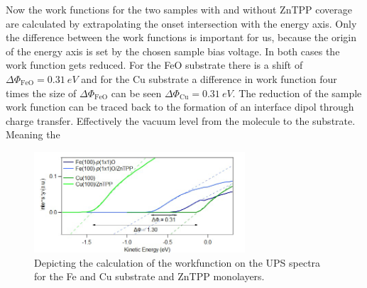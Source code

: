 Now the work functions for the two samples with and without ZnTPP coverage are calculated by extrapolating the onset intersection with the energy axis. Only the difference between the work functions is important for us, because the origin of the energy axis is set by the chosen sample bias voltage.
In both cases the work function gets reduced. 
For the FeO substrate there is a shift of $\Delta\Phi_{\mathrm{FeO}} = \qty{0.31}{eV}$ and for the Cu substrate a difference in work function four times the size of $\Delta\Phi_{\mathrm{FeO}}$ can be seen $\Delta\Phi_{\mathrm{Cu}} = \qty{0.31}{eV}$.
The reduction of the sample work function can be traced back to the formation of an interface dipol through charge transfer.
Effectively the vacuum level  from the molecule to the substrate.
Meaning the 
\begin{figure}[h]
    \centering
    \includegraphics[width = 0.7\textwidth]{Plots/WF.png}
    \caption{Depicting the calculation of the workfunction on the UPS spectra for the Fe and Cu substrate and ZnTPP monolayers.}
    \label{fig:wf}
\end{figure}
\FloatBarrier
